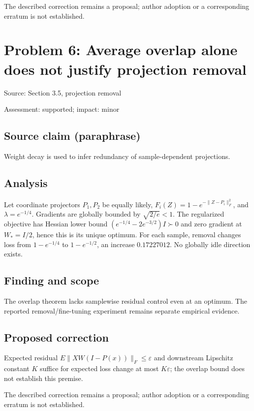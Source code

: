 \documentclass[11pt]{article}
\begin{document}
The described correction remains a proposal; author adoption or a corresponding erratum is not established.

\section*{Problem 6: Average overlap alone does not justify projection removal}

Source: Section 3.5, projection removal

Assessment: supported; impact: minor

\subsection*{Source claim (paraphrase)}

Weight decay is used to infer redundancy of sample-dependent projections.

\subsection*{Analysis}

Let coordinate projectors \(P_1,P_2\) be equally likely, \(F_i(Z)=1-e^{-\|Z-P_i\|_F^2}\), and \(\lambda=e^{-1/4}\). Gradients are globally bounded by \(\sqrt{2/e}<1\). The regularized objective has Hessian lower bound \((e^{-1/4}-2e^{-3/2})I\succ0\) and zero gradient at \(W_*=I/2\), hence this is its unique optimum. For each sample, removal changes loss from \(1-e^{-1/4}\) to \(1-e^{-1/2}\), an increase \(0.17227012\). No globally idle direction exists.

\subsection*{Finding and scope}

The overlap theorem lacks samplewise residual control even at an optimum. The reported removal/fine-tuning experiment remains separate empirical evidence.

\subsection*{Proposed correction}

Expected residual \(E\|XW(I-P(x))\|_F\le\varepsilon\) and downstream Lipschitz constant \(K\) suffice for expected loss change at most \(K\varepsilon\); the overlap bound does not establish this premise.

The described correction remains a proposal; author adoption or a corresponding erratum is not established.
\end{document}

